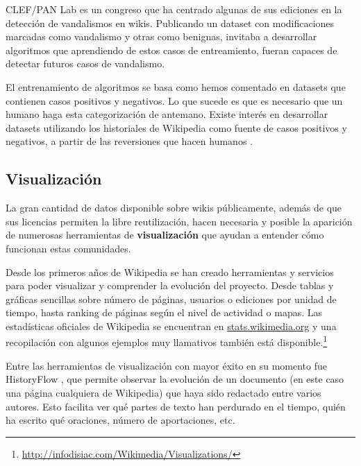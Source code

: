 \documentclass[11pt,onecolumn]{article}
\begin{document}
CLEF/PAN Lab es un congreso que ha centrado algunas de sus ediciones en la detección de vandalismos en wikis. Publicando un dataset con modificaciones marcadas como vandalismo y otras como benignas, invitaba a desarrollar algoritmos que aprendiendo de estos casos de entreamiento, fueran capaces de detectar futuros casos de vandalismo.


El entrenamiento de algoritmos se basa como hemos comentado en datasets que contienen casos positivos y negativos. Lo que sucede es que es necesario que un humano haga esta categorización de antemano. Existe interés en desarrollar datasets utilizando los historiales de Wikipedia como fuente de casos positivos y negativos, a partir de las reversiones que hacen humanos \citep{west2010}.

\subsection{Visualización}


La gran cantidad de datos disponible sobre wikis públicamente, además de que sus licencias permiten la libre reutilización, hacen necesaria y posible la aparición de numerosas herramientas de \textbf{visualización} que ayudan a entender cómo funcionan estas comunidades.

Desde los primeros años de Wikipedia se han creado herramientas y servicios para poder visualizar y comprender la evolución del proyecto. Desde tablas y gráficas sencillas sobre número de páginas, usuarios o ediciones por unidad de tiempo, hasta ranking de páginas según el nivel de actividad o mapas. Las estadísticas oficiales de Wikipedia se encuentran en \href{http://stats.wikimedia.org}{stats.wikimedia.org} y una recopilación con algunos ejemplos muy llamativos también está disponible.\footnote{\href{http://infodisiac.com/Wikimedia/Visualizations/}{http://infodisiac.com/Wikimedia/Visualizations/}}


Entre las herramientas de visualización con mayor éxito en su momento fue HistoryFlow \citep{viegas2004}, que permite observar la evolución de un documento (en este caso una página cualquiera de Wikipedia) que haya sido redactado entre varios autores. Esto facilita ver qué partes de texto han perdurado en el tiempo, quién ha escrito qué oraciones, número de aportaciones, etc.
\end{document}
